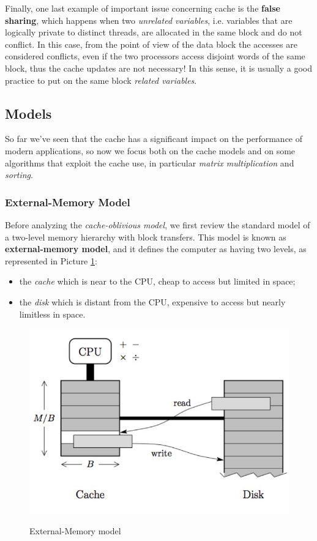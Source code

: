 Finally, one last example of important issue concerning cache is the \textbf{false sharing}, which happens when two \textit{unrelated variables}, i.e. variables that are logically private to distinct threads, are allocated in the same block and do not conflict. In this case, from the point of view of the data block the accesses are considered conflicts, even if the two processors access disjoint words of the same block, thus the cache updates are not necessary! In this sense, it is usually a good practice to put on the same block \textit{related variables}.

\subsection{Models}
So far we've seen that the cache has a significant impact on the performance of modern applications, so now we focus both on the cache models and on some algorithms that exploit the cache use, in particular \textit{matrix multiplication} and \textit{sorting}.

\subsubsection{External-Memory Model}
Before analyzing the \textit{cache-oblivious model}, we first review the standard model of a two-level memory hierarchy with block transfers. This model is known as \textbf{external-memory model}, and it defines the computer as having two levels, as represented in Picture \ref{external_memory_model}:

\begin{itemize}
    \item the \textit{cache} which is near to the CPU, cheap to access but limited in space;
    \item the \textit{disk} which is distant from the CPU, expensive to access but nearly limitless in space.
\end{itemize}


\begin{figure}[h!]
		\centering
		\includegraphics[scale = 1.2]{img/model.jpg}
        \label{external_memory_model}
        \caption{External-Memory model}
\end{figure}

